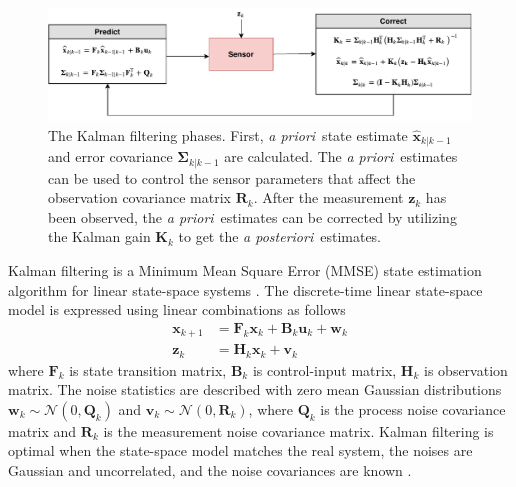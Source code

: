 \documentclass[english, 12pt, a4paper, elec, utf8, a-1b, online]{aaltothesis}
\renewcommand{\vec}[1]{\mathbf{#1}}
\newcommand{\xprior}{\hat{\vec{x}}_{k|k-1}}
\newcommand{\priorecov}{\boldsymbol{\Sigma}_{k|k-1}}
\newcommand{\x}{\vec{x}_k}
\newcommand{\xnext}{\vec{x}_{k+1}}
\newcommand{\z}{\vec{z}_k}
\newcommand{\stmodel}{\vec{F}_k}
\newcommand{\cimodel}{\vec{B}_k}
\newcommand{\cinput}{\vec{u}_k}
\newcommand{\pnoise}{\vec{w}_k}
\newcommand{\omodel}{\vec{H}_k}
\newcommand{\onoise}{\vec{v}_k}
\newcommand{\ocov}{\vec{R}_k}
\newcommand{\pcov}{\vec{Q}_k}
\newcommand{\gain}{\vec{K}_k}
\newcommand{\normal}[2]{\mathcal{N}\left(#1, #2 \right)}
\def\prior{\textit{a priori}\ }
\def\post{\textit{a posteriori}\ }
\begin{document}
\begin{figure}[b]
    \centering
    \includegraphics[width=\textwidth]{figures/KF.pdf}
    \caption{The Kalman filtering phases.
    First, \prior state estimate $\xprior$ and error covariance $\priorecov$ are calculated.
    The \prior estimates can be used to control the sensor parameters that affect the observation covariance matrix $\ocov$.
    After the measurement $\z$ has been observed, the \prior estimates can be corrected by utilizing the Kalman gain $\gain$ to get the \post estimates.
    }
    \label{fig:KF}
\end{figure}

Kalman filtering is a Minimum Mean Square Error (MMSE) state estimation algorithm for linear state-space systems \cite{Zarchan2000}.
The discrete-time linear state-space model is expressed using linear combinations as follows \cite{Zarchan2000}
\begin{align}
    \xnext &= \stmodel \x + \cimodel \cinput + \pnoise \label{eq:lsp_state} \\
    \z &= \omodel \x + \onoise \label{eq:lsp_obs}
\end{align}
where $\stmodel$ is state transition matrix, $\cimodel$ is control-input matrix, $ \omodel $ is observation matrix. 
The noise statistics are described with zero mean Gaussian distributions $\pnoise \sim \normal{0}{\pcov}$ and $\onoise \sim \normal{0}{\ocov}$, where $\pcov$ is the process noise covariance matrix and $\ocov$ is the measurement noise covariance matrix.
Kalman filtering is optimal when the state-space model matches the real system, the noises are Gaussian and uncorrelated, and the noise covariances are known \cite{Zarchan2000}.
\end{document}
